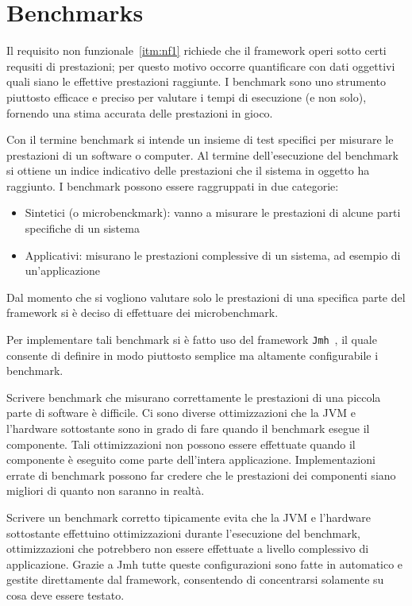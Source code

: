 \section{Benchmarks}\label{sec:benchmarks}
Il requisito non funzionale~\ref{itm:nf1} richiede che il framework operi sotto certi requsiti di prestazioni;
per questo motivo occorre quantificare con dati oggettivi quali siano le effettive prestazioni raggiunte.
I benchmark sono uno strumento piuttosto efficace e preciso per valutare i tempi di esecuzione (e non solo), fornendo
una stima accurata delle prestazioni in gioco.

Con il termine benchmark si intende un insieme di test specifici per misurare le prestazioni di un software o computer.
Al termine dell'esecuzione del benchmark si ottiene un indice indicativo delle prestazioni che il sistema in oggetto ha
raggiunto.
I benchmark possono essere raggruppati in due categorie:
\begin{itemize}
    \item Sintetici (o microbenckmark): vanno a misurare le prestazioni di alcune parti specifiche di un sistema
    \item Applicativi: misurano le prestazioni complessive di un sistema, ad esempio di un'applicazione
\end{itemize}

Dal momento che si vogliono valutare solo le prestazioni di una specifica parte del framework si è deciso di effettuare
dei microbenchmark.

Per implementare tali benchmark si è fatto uso del framework \texttt{Jmh}~\cite{jmh}, il quale consente di definire in
modo piuttosto semplice ma altamente configurabile i benchmark.

Scrivere benchmark che misurano correttamente le prestazioni di una piccola parte di software è difficile.
Ci sono diverse ottimizzazioni che la JVM e l'hardware sottostante sono in grado di fare quando il benchmark esegue il
componente.
Tali ottimizzazioni non possono essere effettuate quando il componente è eseguito come parte dell'intera applicazione.
Implementazioni errate di benchmark possono far credere che le prestazioni dei componenti siano migliori di quanto non
saranno in realtà.

Scrivere un benchmark corretto tipicamente evita che la JVM e l'hardware sottostante effettuino ottimizzazioni
durante l'esecuzione del benchmark, ottimizzazioni che potrebbero non essere effettuate a livello complessivo di
applicazione.
Grazie a Jmh tutte queste configurazioni sono fatte in automatico e gestite direttamente dal framework, consentendo di
concentrarsi solamente su cosa deve essere testato.

